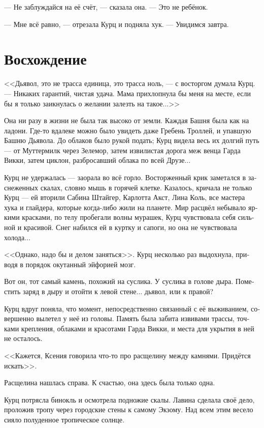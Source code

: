 \documentclass[a4paper,12pt,fleqn]{book}\usepackage{cooltooltips}\usepackage{polyglossia}\setdefaultlanguage[babelshorthands=true]{russian}\setotherlanguage{english}\defaultfontfeatures{Ligatures=TeX,Mapping=tex-text} \usepackage{xcolor}\definecolor{lightgray}{HTML}{bbbbbb}\color{lightgray}\newcommand{\ml}[3]{\textenglish{\textcolor{black}{#3}}}
\newcommand{\asterism}{\vspace{1em}{\centering\Large\bfseries$\ast~\ast~\ast$\par}\vspace{1em}}
\begin{document}
--- Не заблуждайся на её счёт, --- сказала она.
--- Это не ребёнок.

--- Мне всё равно, --- отрезала Курц и подняла хук.
--- Увидимся завтра.

\section{Восхождение}

<<Дьявол, это не трасса единица, это трасса ноль, --- с восторгом думала Курц.
--- Никаких гарантий, чистая удача.
Мама прихлопнула бы меня на месте, если бы я только заикнулась о желании залезть на такое...>>

\asterism

Она ни разу в жизни не была так высоко от земли.
Каждая Башня была как на ладони.
Где-то вдалеке можно было увидеть даже Гребень Троллей, и упавшую Башню Дьявола.
До облаков было рукой подать;
Курц видела весь их долгий путь --- от Муттермилк через Зелемор, затем извилистая дорога меж венца Гарда Викки, затем циклон, разбросавший облака по всей Друзе...

Курц не удержалась --- заорала во всё горло.
Восторженный крик заметался в заснеженных скалах, словно мышь в горячей клетке.
Казалось, кричала не только Курц --- ей вторили Сабина Штайгер, Карлотта Акст, Лина Коль, все мастера хука и глайдера, которые когда-либо жили на планете.
Мир расцвёл небывало яркими красками, по телу пробегали волны мурашек, Курц чувствовала себя сильной и красивой.
Снег набился ей в куртку и сапоги, но она не чувствовала холода...

<<Однако, надо бы и делом заняться>>.
Курц несколько раз выдохнула, приводя в порядок окутанный эйфорией мозг.

Вот он, тот самый камень, похожий на суслика.
У суслика в голове дыра.
Поместить заряд в дыру и отойти к левой стене... дьявол, или к правой?

Курц вдруг поняла, что момент, непосредственно связанный с её выживанием, совершенно вылетел у неё из головы.
Память была забита извивами трассы, точками крепления, облаками и красотами Гарда Викки, и места для укрытия в ней не осталось.

<<Кажется, Ксения говорила что-то про расщелину между камнями.
Придётся искать>>.

Расщелина нашлась справа.
К счастью, она здесь была только одна.

\asterism

Курц потрясла бинокль и осмотрела подножие скалы.
Лавина сделала своё дело, проложив тропу через городские стены к самому Экзому.
Над всем этим весело сияло полуденное тропическое солнце.
\end{document}
